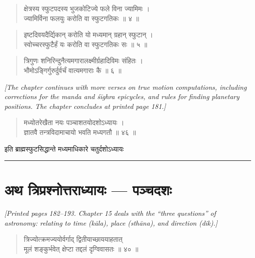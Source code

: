 \documentclass[11pt,a4paper]{article}
\newcommand{\longline}{\noindent\rule{\textwidth}{0.4pt}}
\newcommand{\cnote}[1]{\textcolor{notecolor}{\textit{#1}}}
\newcommand{\dev}[1]{{\devanagarifont #1}}
\newcommand{\dsec}[1]{\section*{\dev{#1}}}
\newenvironment{shloka}{\begin{verse}\devanagarifont\large}{\end{verse}}
\begin{document}
\begin{shloka}
क्षेत्रस्य स्फुटपदस्य भुजकोटिज्ये फले विना ज्यामिमः ।\\
ज्यामिर्विना फलयुः करोति वा स्फुटगतिकः ॥ ४ ॥
\end{shloka}

\begin{shloka}
इष्टदिवयदैर्द्यिकान् करोति यो मध्यमान् ग्रहान् स्फुटान् ।\\
स्वोच्चरस्फुटैर्हं यः करोति वा स्फुटगतिकः सः ॥ ५ ॥
\end{shloka}

\begin{shloka}
त्रिगुणः शनिरिन्दुनैत्यमगारालक्ष्मीर्ग्रहादिविमः संहितः ।\\
भौमोऽङ्गिर्गुरुर्दुर्वर्चं वात्यमगाराः कै ॥ ६ ॥
\end{shloka}

\vspace{0.5cm}
\cnote{[The chapter continues with more verses on true motion
computations, including corrections for the manda and śīghra epicycles,
and rules for finding planetary positions. The chapter concludes at
printed page 181.]}

\begin{shloka}
मध्योतरेखैता नयः पञ्चाशतयोदशोऽध्यायः ।\\
ज्ञातवै तन्त्रविदामाचायो भवति मध्यगतौ ॥ ४६ ॥
\end{shloka}

\begin{center}
\dev{इति ब्राह्मस्फुटसिद्धान्ते मध्यमाधिकारे चतुर्दशोऽध्यायः}
\end{center}

\longline
\newpage

\dsec{अथ त्रिप्रश्नोत्तराध्यायः — पञ्चदशः}

\cnote{[Printed pages 182–193. Chapter 15 deals with the “three
questions'' of astronomy: relating to time (\textit{kāla}), place
(\textit{sthāna}), and direction (\textit{dik}).]}

\begin{shloka}
त्रिज्योत्क्रमज्ययोर्वर्गाद् द्वितीयाच्छाययाहतात् \\
मूलं शङ्कुर्भवेत् क्षेप्टा तद्दलं दृग्विवासतः ॥ ४० ॥
\end{shloka}
\end{document}
